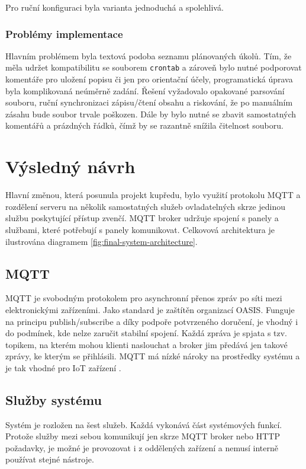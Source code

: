 Pro ruční konfiguraci byla varianta jednoduchá a spolehlivá.

\subsubsection{Problémy implementace}
Hlavním problémem byla textová podoba seznamu plánovaných úkolů. Tím, že měla udržet kompatibilitu se souborem \lstinline|crontab| a zároveň bylo nutné podporovat komentáře pro uložení popisu či jen pro orientační účely, programatická úprava byla komplikovaná neúměrně zadání. Řešení vyžadovalo opakované parsování souboru, ruční synchronizaci zápisu/čtení obsahu a riskování, že po manuálním zásahu bude soubor trvale poškozen. Dále by bylo nutné se zbavit samostatných komentářů a prázdných řádků, čímž by se razantně snížila čitelnost souboru.

\section{Výsledný návrh}
Hlavní změnou, která posunula projekt kupředu, bylo využití protokolu MQTT a rozdělení serveru na několik samostatných služeb ovladatelných skrze jedinou službu poskytující přístup zvenčí. MQTT broker udržuje spojení s panely a službami, které potřebují s panely komunikovat. Celkovová architektura je ilustrována diagramem \ref{fig:final-system-architecture}.

\subsection{MQTT}
MQTT je svobodným protokolem pro asynchronní přenos zpráv po síti mezi elektronickými zařízeními. Jako standard je zaštítěn organizací OASIS. Funguje na principu publish/subscribe a díky podpoře potvrzeného doručení, je vhodný i do podmínek, kde nelze zaručit stabilní spojení. Každá zpráva je spjata s tzv. topikem, na kterém mohou klienti naslouchat a broker jim předává jen takové zprávy, ke kterým se přihlásili. MQTT má nízké nároky na prostředky systému a je tak vhodné pro IoT zařízení \cite{MQTTStandardIoT}.

\subsection{Služby systému}
Systém je rozložen na šest služeb. Každá vykonává část systémových funkcí. Protože služby mezi sebou komunikují jen skrze MQTT broker nebo HTTP požadavky, je možné je provozovat i z oddělených zařízení a nemusí interně používat stejné nástroje.

